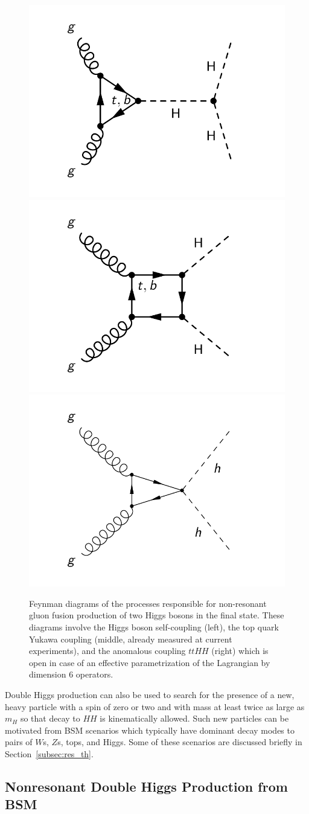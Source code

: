 \begin{figure}
\begin{center}
\includegraphics[width=.32\textwidth]{figures/intro/diHiggs_lambda.pdf}
\includegraphics[width=.32\textwidth]{figures/intro/diHiggs_yt.pdf}
\includegraphics[width=.32\textwidth]{figures/intro/diHiggs_c2.pdf}
\end{center}
\caption{
\label{fig:diHiggs_diagrams}
Feynman diagrams of the processes responsible for non-resonant gluon fusion production of two
Higgs bosons in the final state.
These diagrams involve the Higgs boson self-coupling (left), the top quark Yukawa coupling
(middle, already measured at current experiments),
and the anomalous coupling $ttHH$ (right) which is open in case of an effective
parametrization of the Lagrangian by dimension 6 operators.}
\end{figure}

Double Higgs production can also be used to search for the presence of a new, heavy particle
with a spin of zero or two and with
mass at least twice as large as $m_H$ so that decay to $HH$ is kinematically allowed. Such new particles
can be motivated from BSM scenarios which typically have dominant decay modes to pairs of
$W$s, $Z$s, tops, and Higgs. Some of these scenarios are discussed briefly in
Section~\ref{subsec:res_th}.

\subsection{Nonresonant Double Higgs Production from BSM\label{subsec:nonres_th}}

